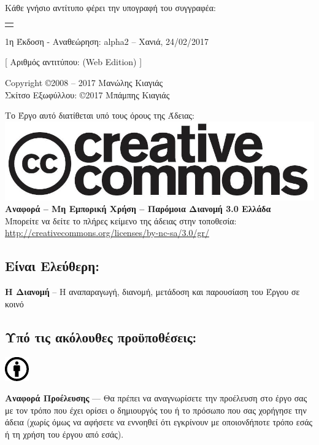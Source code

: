 %
%
\maketitle
\begin{center}
Κάθε γνήσιο αντίτυπο φέρει την υπογραφή του συγγραφέα:
\begin{tabular}{p{}}
\\
\\
\end{tabular}

\smallskip
1η Έκδοση - Αναθεώρηση: alpha2 -- Χανιά, 24/02/2017

[ Αριθμός αντιτύπου: (Web Edition) ]

\smallskip
Copyright \copyright 2008 -- 2017 Μανώλης Κιαγιάς\\
Σκίτσο Εξωφύλλου: \copyright 2017 Μπάμπης Κιαγιάς

Το Έργο αυτό διατίθεται υπό τους όρους της Άδειας:\\
\includegraphics[scale=0.2]{images/license/cc-logo}\\
\textbf{Αναφορά -- Μη Εμπορική Χρήση --  Παρόμοια Διανομή 3.0 Ελλάδα}\\
Μπορείτε να δείτε το πλήρες κείμενο της άδειας στην τοποθεσία:\\
\url{http://creativecommons.org/licenses/by-nc-sa/3.0/gr/}
\end{center}
\subsection*{Είναι Ελεύθερη:}

\noindent
\textbf{Η Διανομή} -- Η αναπαραγωγή, διανομή, μετάδοση και παρουσίαση του Έργου σε κοινό
\subsection*{Υπό τις ακόλουθες προϋποθέσεις:}
\vspace{1em}
\noindent
\parbox{1.5cm}{\includegraphics[scale=0.15]{images/license/cc_by_30}}
\parbox{10.5cm}{\textbf{Αναφορά Προέλευσης} — Θα πρέπει να αναγνωρίσετε την προέλευση στο έργο σας με τον τρόπο που έχει ορίσει ο δημιουργός του ή το πρόσωπο που σας χορήγησε την άδεια (χωρίς όμως να αφήσετε να εννοηθεί  ότι εγκρίνουν  με οποιονδήποτε τρόπο εσάς ή τη χρήση του έργου από εσάς).}

